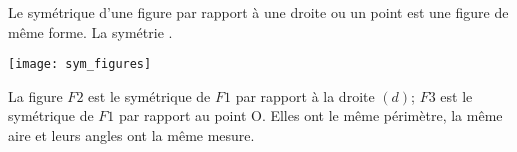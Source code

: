 \documentclass[xcolor={dvipsnames}]{beamer}
\begin{document}
\begin{frame}
	\begin{myprop}
		Le symétrique d'une figure par rapport à une droite ou un point est une figure de même forme. La symétrie .\pause
	\end{myprop}
	
	\begin{myex}
		\begin{center}
			\texttt{[image: sym\_figures]}
		\end{center}
		
		La figure $F2$ est le symétrique de $F1$ par rapport à la droite $(d)$; $F3$ est le symétrique de $F1$ par rapport au point O.\pause
		Elles ont le même périmètre, la même aire et leurs angles ont la même mesure.
	\end{myex}
\end{frame}
\end{document}

